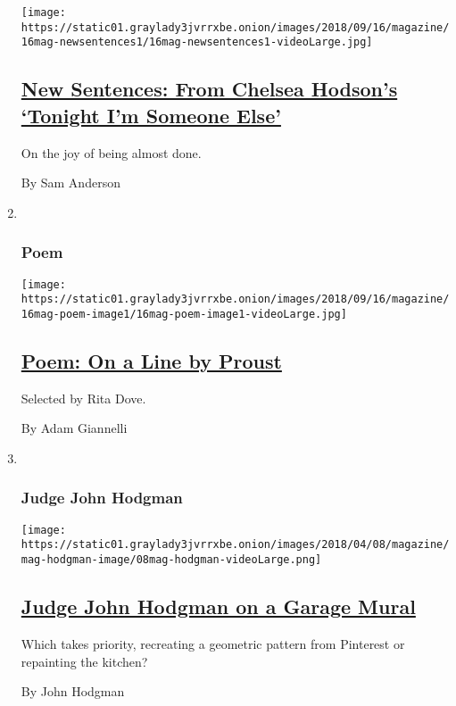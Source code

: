 \begin{enumerate}
  \texttt{[image: https://static01.graylady3jvrrxbe.onion/images/2018/09/16/magazine/16mag-newsentences1/16mag-newsentences1-videoLarge.jpg]}

  \hypertarget{new-sentences-from-chelsea-hodsons-tonight-im-someone-else}{%
  \subsection{\texorpdfstring{\href{/2018/09/11/magazine/new-sentences-from-chelsea-hodsons-tonight-im-someone-else.html}{New
  Sentences: From Chelsea Hodson's `Tonight I'm Someone
  Else'}}{New Sentences: From Chelsea Hodson's `Tonight I'm Someone Else'}}\label{new-sentences-from-chelsea-hodsons-tonight-im-someone-else}}

  On the joy of being almost done.

  By Sam Anderson
\item ~
  \hypertarget{poem}{%
  \subsubsection{Poem}\label{poem}}

  \texttt{[image: https://static01.graylady3jvrrxbe.onion/images/2018/09/16/magazine/16mag-poem-image1/16mag-poem-image1-videoLarge.jpg]}

  \hypertarget{poem-on-a-line-by-proust}{%
  \subsection{\texorpdfstring{\href{/2018/09/13/magazine/poem-on-a-line-by-proust.html}{Poem:
  On a Line by
  Proust}}{Poem: On a Line by Proust}}\label{poem-on-a-line-by-proust}}

  Selected by Rita Dove.

  By Adam Giannelli
\item ~
  \hypertarget{judge-john-hodgman}{%
  \subsubsection{Judge John Hodgman}\label{judge-john-hodgman}}

  \texttt{[image: https://static01.graylady3jvrrxbe.onion/images/2018/04/08/magazine/mag-hodgman-image/08mag-hodgman-videoLarge.png]}

  \hypertarget{judge-john-hodgman-on-a-garage-mural}{%
  \subsection{\texorpdfstring{\href{/2018/09/13/magazine/judge-john-hodgman-on-a-garage-mural.html}{Judge
  John Hodgman on a Garage
  Mural}}{Judge John Hodgman on a Garage Mural}}\label{judge-john-hodgman-on-a-garage-mural}}

  Which takes priority, recreating a geometric pattern from Pinterest or
  repainting the kitchen?

  By John Hodgman
\end{enumerate}

